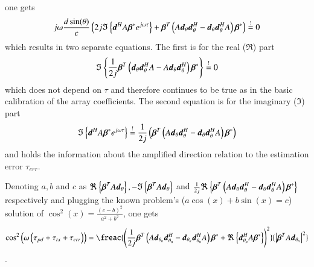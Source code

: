 one gets
\begin{equation}
    j\omega\frac{d\sin(\theta)}{c}
    \left(
    2j\Im
    \left\{
    \boldsymbol{d}^{H}A\boldsymbol{\beta}^{*}e^{j\omega\tau}
    \right\}
    +
    \boldsymbol{\beta}^{T}
    \left(
    A\boldsymbol{d}_{\theta}\boldsymbol{d}_{\theta}^{H}
    -
    \boldsymbol{d}_{\theta}\boldsymbol{d}_{\theta}^{H}A
    \right)
    \boldsymbol{\beta}^{*}
    \right)
    \stackrel{!}{=} 0
\end{equation}
which results in two separate equations. The first is for the real ($\Re$) part 
\begin{equation}
    \Im
    \left\{
    \frac{1}{2j}
    \boldsymbol{\beta}^{T}
    \left(
    \boldsymbol{d}_{\theta}\boldsymbol{d}_{\theta}^{H}A
    -
    A\boldsymbol{d}_{\theta}\boldsymbol{d}_{\theta}^{H}
    \right)
    \boldsymbol{\beta}^{*}
    \right\}
    \stackrel{!}{=} 
    0    
\end{equation}
which does not depend on $\tau$ and therefore continues to be true as in the basic calibration of the array coefficients.
The second equation is for the imaginary ($\Im$) part
\begin{equation}
    \Im
    \left\{
    \boldsymbol{d}^{H}A\boldsymbol{\beta}^{*}e^{j\omega\tau}
    \right\}
    \stackrel{!}{=}
    \frac{1}{2j}
    \left(
    \boldsymbol{\beta}^{T}
    \left
    (A\boldsymbol{d}_{\theta}\boldsymbol{d}_{\theta}^{H}
    -
    \boldsymbol{d}_{\theta}\boldsymbol{d}_{\theta}^{H}A
    \right)
    \boldsymbol{\beta}^{*}
    \right)    
\end{equation} 
and holds the information about the amplified direction relation to the estimation error $\tau_{err}$.
\par
Denoting $a, b$ and $c$ as 
$
\Re\left\{\boldsymbol{\beta}^{T}A\boldsymbol{d}_{\theta}\right\}
,
-\Im\left\{\boldsymbol{\beta}^{T}A\boldsymbol{d}_{\theta}\right\}
$
and
$
\frac{1}{2j}
\Re
\left\{
\boldsymbol{\beta}^{T}
\left
(A\boldsymbol{d}_{\theta}\boldsymbol{d}_{\theta}^{H}
-
\boldsymbol{d}_{\theta}\boldsymbol{d}_{\theta}^{H}A
\right)
\boldsymbol{\beta}^{*}
\right\}
$
respectively and plugging the known problem's ($ a\cos(x) + b\sin(x) = c $) solution of
$\cos^{2}(x) = \frac{\left(c-b\right)^{2}}{a^{2}+b^{2}}$, one gets
\begin{equation}
    \label{eq_tauErrTheta}
    \cos^{2}\left(\omega\left(\tau_{pd}+\tau_{tx}+\tau_{err}\right)\right) 
    =
    \freac
    {\left(
    \frac{1}{2j}
    \vecnot{\beta}^{T}
    \left
    (A\vecnot{d}_{\theta_{n}}\vecnot{d}_{\theta_{n}}^{H}
    -
    \vecnot{d}_{\theta_{n}}\vecnot{d}_{\theta_{n}}^{H}A
    \right)
    \vecnot{\beta}^{*}
    +
    \Re\left\{\vecnot{d}_{\theta_{n}}^{H}A\vecnot{\beta}^{*}\right\}
    \right)^{2}}
    {
    \left| \vecnot{\beta}^{T}A\vecnot{d}_{\theta_{n}} \right|^{2}
    }
\end{equation}.